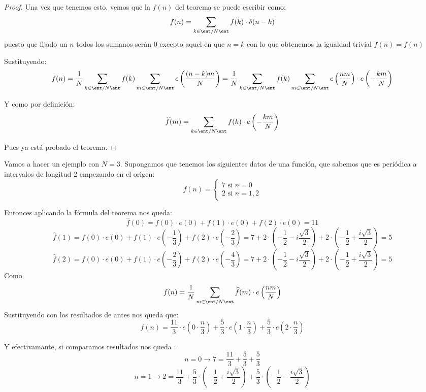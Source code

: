 \begin{proof}
	Una vez que tenemos esto, vemos que la $f(n)$ del teorema se puede escribir como:
	$$f(n) = \sum_{k\in \ent/N\ent} f(k) \cdot \delta(n-k)$$
	puesto que fijado un $n$ todos los sumanos serán 0 excepto aquel en que $n=k$ con lo que obtenemos la igualdad trivial $f(n)=f(n)$

	Sustituyendo:
	$$f(n) =\frac{1}{N} \sum_{k\in \ent/N\ent} f(k)  \sum_{m \in \ent/N\ent} e\left(\frac{(n-k)m}{N}\right) =  \frac{1}{N} \sum_{k\in \ent/N\ent} f(k)  \sum_{m \in \ent/N\ent} e\left(\frac{nm}{N}\right) \cdot e\left(- \frac{km}{N}\right)$$

	Y como por definición:
	$$\widehat{f}(m) = \sum_{k\in \ent/N\ent} f(k) \cdot e\left(- \frac{km}{N}\right)$$

	Pues ya está probado el teorema.
\end{proof}
\begin{example}
	Vamos a hacer un ejemplo con $N=3$. Supongamos que tenemos los siguientes datos de una función, que sabemos que es periódica a intervalos de longitud 2 empezando en el origen:
	$$f(n) = \begin{cases}
	7 \text{ si } n= 0\\
	2 \text{ si } n = 1 , 2
	\end{cases}$$

	Entonces aplicando la fórmula del teorema nos queda:
	$$\widehat{f}(0) = f(0)\cdot e(0) + f(1)\cdot e(0) + f(2) \cdot e(0) =  11$$
	$$\widehat{f}(1) = f(0)\cdot e(0) + f(1)\cdot e\left(-\frac{1}{3}\right) + f(2)\cdot e\left(-\frac{2}{3}\right) = 7 + 2\cdot\left(-\frac{1}{2} -i\frac{\sqrt{3}}{2}\right) + 2\cdot \left(-\frac{1}{2} + \frac{i\sqrt{3}}{2}\right) = 5$$
	$$\widehat{f}(2) = f(0)\cdot e(0) + f(1)\cdot e\left(- \frac{2}{3}\right) + f(2) \cdot e\left(-\frac{4}{3}\right) = 7 + 2\cdot\left(-\frac{1}{2} -i\frac{\sqrt{3}}{2}\right) + 2\cdot \left(-\frac{1}{2} + \frac{i\sqrt{3}}{2}\right) = 5$$
	Como
	$$f(n) = \frac{1}{N} \sum_{m\in \ent/ N\ent} \widehat{f}(m) \cdot e\left(\frac{nm}{N}\right)$$
	Sustituyendo con los resultados de antes nos queda que:
	$$f(n) = \frac{11}{3}\cdot e\left(0 \cdot \frac{n}{3}\right) + \frac{5}{3}\cdot e\left(1 \cdot \frac{n}{3}\right) + \frac{5}{3} \cdot e\left(2 \cdot \frac{n}{3}\right)$$

	Y efectivamante, si comparamos resultados nos queda :
	$$n = 0 \rightarrow 7 = \frac{11}{3} + \frac{5}{3} + \frac{5}{3}$$
	$$n = 1 \rightarrow 2 = \frac{11}{3} + \frac{5}{3} \cdot \left(- \frac{1}{2} + \frac{i \sqrt{3}}{2}\right) + \frac{5}{3} \cdot \left(- \frac{1}{2} -\frac{i \sqrt{3}}{2}\right)$$
\end{example}

